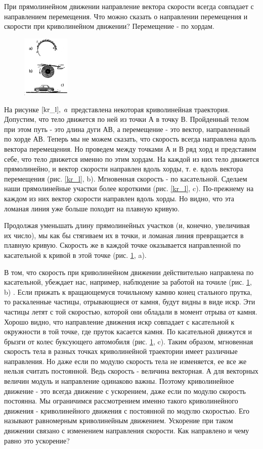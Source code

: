 \documentclass[a6paper, 11pt]{diss_4}
\renewcommand{\'}{\,'}
\begin{document}
  При прямолинейном движении направление вектора скорости всегда
совпадает с направлением перемещения. Что можно сказать о направлении
перемещения и скорости при криволинейном движении? Перемещение - по хордам.

\begin{figure}
\includegraphics[width=0.2\textwidth]{img/img19.eps}
\caption{}
\label{ps_kl}
\end{figure}
  На рисунке $\ref{kr_l},\ a$ представлена некоторая криволинейная траектория.
Допустим, что тело движется по ней из точки А в точку В. Пройденный телом при
этом путь - это длина дуги АВ, а перемещение - это вектор, направленный по
хорде АВ. Теперь мы не можем сказать, что скорость всегда направлена вдоль
вектора перемещения. Но проведем между точками А и В ряд хорд и представим
себе, что тело движется именно по этим хордам. На каждой из них тело движется
прямолинейно, и вектор скорости направлен вдоль хорды, т. е. вдоль вектора
перемещения (рис. \ref{kr_l}, b). Мгновенная скорость - по касательной. Сделаем наши
 прямолинейные участки более короткими (рис. \ref{kr_l}, c). По-прежнему на каждом из
них вектор скорости направлен вдоль хорды. Но видно, что эта ломаная линия уже
больше походит на плавную кривую.

  Продолжая уменьшать длину прямолинейных участков (и, конечно,
увеличивая их число), мы как бы стягиваем их в точки, и ломаная линия
превращается в плавную кривую. Скорость же в каждой точке оказывается
направленной по касательной к кривой в этой точке (рис. \ref{ps_kl}, a).

  В том, что скорость при криволинейном движении действительно направлена
по касательной, убеждает нас, например, наблюдение за работой на точиле (рис. \ref{ps_kl}, b)
. Если прижать к вращающемуся точильному камню конец стального прутка, то
раскаленные частицы, отрывающиеся от камня, будут видны в виде искр. Эти
частицы летят с той скоростью, которой они обладали в момент отрыва от камня.
Хорошо видно, что направление движения искр совпадает с касательной к
окружности в той точке, где пруток касается камня. По касательной движутся и
брызги от колес буксующего автомобиля (рис. \ref{ps_kl}, c). Таким образом, мгновенная
скорость тела в разных точках криволинейной траектории имеет различные
направления. Но даже если по модулю скорость
тела не изменяется, ее все же нельзя считать постоянной. Ведь скорость -
величина векторная. А для векторных величин модуль и направление одинаково
важны. Поэтому криволинейное движение - это всегда движение с ускорением, даже
если по модулю скорость постоянна. Мы ограничимся рассмотрением именно такого
криволинейного движения - криволинейного движения с постоянной по модулю
скоростью. Его называют равномерным криволинейным движением. Ускорение при
таком движении связано с изменением направления скорости. Как направлено и чему
равно это ускорение?
\end{document}
